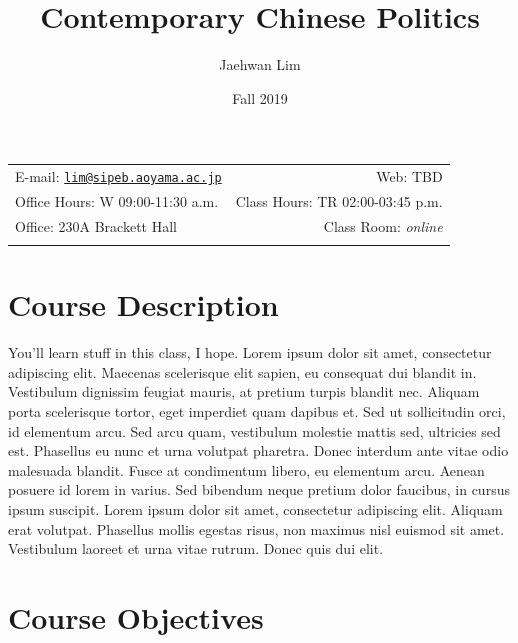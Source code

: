 \documentclass[11pt,]{article}
\title{Contemporary Chinese Politics}
\author{Jaehwan Lim}
\date{Fall 2019}
\begin{document}
  

		\maketitle
		
	
		\thispagestyle{firststyle}



	\noindent \begin{tabular*}{\textwidth}{ @{\extracolsep{\fill}} lr @{\extracolsep{\fill}}}


E-mail: \texttt{\href{mailto:lim@sipeb.aoyama.ac.jp}{\nolinkurl{lim@sipeb.aoyama.ac.jp}}} & Web: TBD\\
Office Hours: W 09:00-11:30 a.m.  &  Class Hours: TR 02:00-03:45 p.m.\\
Office: 230A Brackett Hall  & Class Room: \emph{online}\\
	&  \\
	\hline
	\end{tabular*}
	
\vspace{2mm}
	


\section{Course Description}\label{course-description}

You'll learn stuff in this class, I hope. Lorem ipsum dolor sit amet,
consectetur adipiscing elit. Maecenas scelerisque elit sapien, eu
consequat dui blandit in. Vestibulum dignissim feugiat mauris, at
pretium turpis blandit nec. Aliquam porta scelerisque tortor, eget
imperdiet quam dapibus et. Sed ut sollicitudin orci, id elementum arcu.
Sed arcu quam, vestibulum molestie mattis sed, ultricies sed est.
Phasellus eu nunc et urna volutpat pharetra. Donec interdum ante vitae
odio malesuada blandit. Fusce at condimentum libero, eu elementum arcu.
Aenean posuere id lorem in varius. Sed bibendum neque pretium dolor
faucibus, in cursus ipsum suscipit. Lorem ipsum dolor sit amet,
consectetur adipiscing elit. Aliquam erat volutpat. Phasellus mollis
egestas risus, non maximus nisl euismod sit amet. Vestibulum laoreet et
urna vitae rutrum. Donec quis dui elit.

\section{Course Objectives}\label{course-objectives}
\end{document}
